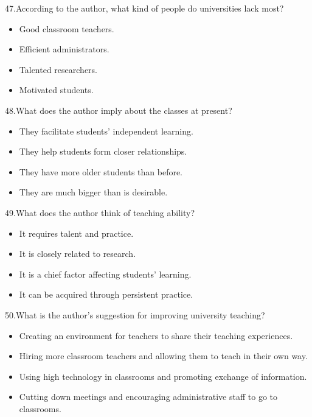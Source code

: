 \documentclass[UTF8,11pt]{ctexart}
\begin{document}
47.According to the author, what kind of people do universities lack most?


\begin{itemize}[leftmargin=2em,itemsep=.2em,topsep=.4em]\item[A.] Good classroom teachers.
\end{itemize}

\begin{itemize}[leftmargin=2em,itemsep=.2em,topsep=.4em]\item[B.] Efficient administrators.
\item[C.] Talented researchers.
\item[D.] Motivated students.
\end{itemize}

48.What does the author imply about the classes at present?


\begin{itemize}[leftmargin=2em,itemsep=.2em,topsep=.4em]\item[A.] They facilitate students’ independent learning.
\item[B.] They help students form closer relationships.
\item[C.] They have more older students than before.
\item[D.] They are much bigger than is desirable.
\end{itemize}

49.What does the author think of teaching ability?


\begin{itemize}[leftmargin=2em,itemsep=.2em,topsep=.4em]\item[A.] It requires talent and practice.
\item[B.] It is closely related to research.
\item[C.] It is a chief factor affecting students’ learning.
\item[D.] It can be acquired through persistent practice.
\end{itemize}

50.What is the author’s suggestion for improving university teaching?


\begin{itemize}[leftmargin=2em,itemsep=.2em,topsep=.4em]\item[A.] Creating an environment for teachers to share their teaching experiences.
\item[B.] Hiring more classroom teachers and allowing them to teach in their own way.
\item[C.] Using high technology in classrooms and promoting exchange of information.
\item[D.] Cutting down meetings and encouraging administrative staff to go to classrooms.
\end{itemize}
\end{document}
